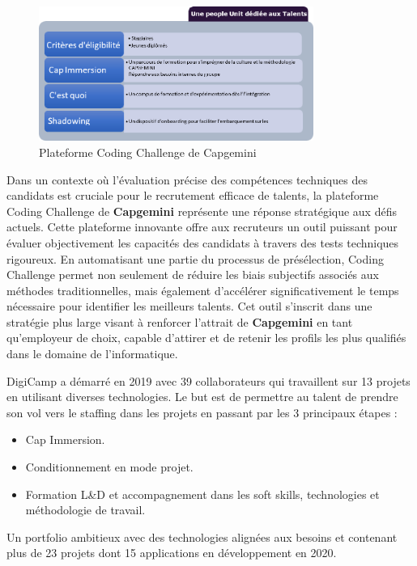 \documentclass[12pt,a4paper,twoside,openright]{report}
\begin{document}
\begin{figure}[H]
\centering
\includegraphics[width=0.8\textwidth]{latex_media/media/image6.png}
\caption{Plateforme Coding Challenge de Capgemini}
\label{fig:coding-challenge-capgemini}
\end{figure}

Dans
un contexte où l'évaluation précise des compétences techniques des
candidats est cruciale pour le recrutement efficace de talents, la
plateforme Coding Challenge de \textbf{Capgemini} représente une réponse
stratégique aux défis actuels. Cette plateforme innovante offre aux
recruteurs un outil puissant pour évaluer objectivement les capacités
des candidats à travers des tests techniques rigoureux. En automatisant
une partie du processus de présélection, Coding Challenge permet non
seulement de réduire les biais subjectifs associés aux méthodes
traditionnelles, mais également d'accélérer significativement le temps
nécessaire pour identifier les meilleurs talents. Cet outil s'inscrit
dans une stratégie plus large visant à renforcer l'attrait de
\textbf{Capgemini} en tant qu'employeur de choix, capable d'attirer et
de retenir les profils les plus qualifiés dans le domaine de
l'informatique.

DigiCamp a démarré en 2019 avec 39 collaborateurs qui travaillent sur 13
projets en utilisant diverses technologies. Le but est de permettre au
talent de prendre son vol vers le staffing dans les projets en passant
par les 3 principaux étapes :

\begin{itemize}
\item
  Cap Immersion.
\item
  Conditionnement en mode projet.
\item
  Formation L\&D et accompagnement dans les soft skills, technologies et
  méthodologie de travail.
\end{itemize}

Un portfolio ambitieux avec des technologies alignées aux besoins et
contenant plus de 23 projets dont 15 applications en développement en
2020.
\end{document}
